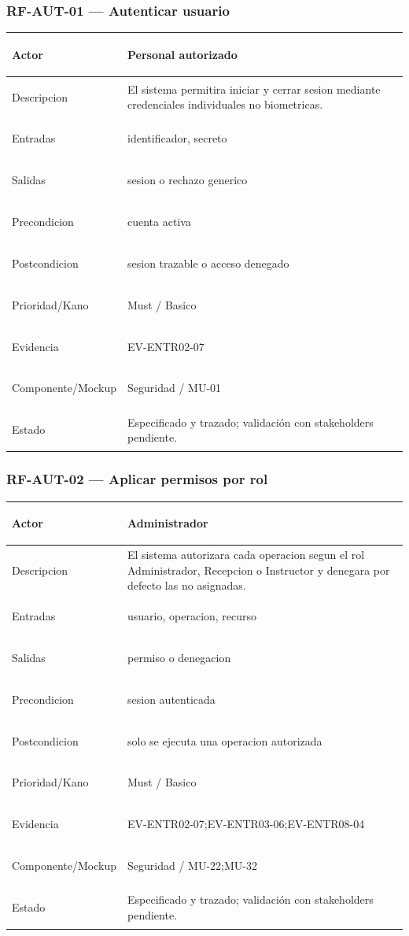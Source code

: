 \documentclass[11pt,a4paper,twoside]{article}
\begin{document}
\subsubsection{RF-AUT-01 — Autenticar usuario}
\begingroup
\renewcommand{\arraystretch}{1.12}
\setlength{\tabcolsep}{5pt}
\begin{tabularx}{\textwidth}{|>{\bfseries\raggedright\arraybackslash}p{3.35cm}|>{\raggedright\arraybackslash}X|}
\hline
Actor & Personal autorizado \\ \hline
Descripcion & El sistema permitira iniciar y cerrar sesion mediante credenciales individuales no biometricas. \\ \hline
Entradas & identificador, secreto \\ \hline
Salidas & sesion o rechazo generico \\ \hline
Precondicion & cuenta activa \\ \hline
Postcondicion & sesion trazable o acceso denegado \\ \hline
Prioridad/Kano & Must / Basico \\ \hline
Evidencia & EV-ENTR02-07 \\ \hline
Componente/Mockup & Seguridad / MU-01 \\ \hline
Estado & Especificado y trazado; validación con stakeholders pendiente. \\ \hline
\end{tabularx}
\endgroup

\subsubsection{RF-AUT-02 — Aplicar permisos por rol}
\begingroup
\renewcommand{\arraystretch}{1.12}
\setlength{\tabcolsep}{5pt}
\begin{tabularx}{\textwidth}{|>{\bfseries\raggedright\arraybackslash}p{3.35cm}|>{\raggedright\arraybackslash}X|}
\hline
Actor & Administrador \\ \hline
Descripcion & El sistema autorizara cada operacion segun el rol Administrador, Recepcion o Instructor y denegara por defecto las no asignadas. \\ \hline
Entradas & usuario, operacion, recurso \\ \hline
Salidas & permiso o denegacion \\ \hline
Precondicion & sesion autenticada \\ \hline
Postcondicion & solo se ejecuta una operacion autorizada \\ \hline
Prioridad/Kano & Must / Basico \\ \hline
Evidencia & EV-ENTR02-07;EV-ENTR03-06;EV-ENTR08-04 \\ \hline
Componente/Mockup & Seguridad / MU-22;MU-32 \\ \hline
Estado & Especificado y trazado; validación con stakeholders pendiente. \\ \hline
\end{tabularx}
\endgroup
\end{document}
